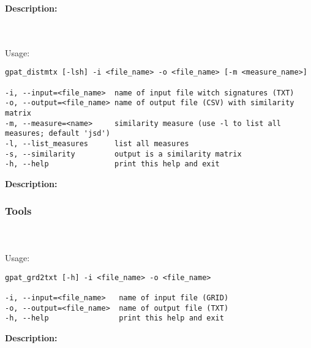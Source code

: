 
{\bf Description:}

{}
\\\\
Usage:

\begin{minipage}{\linewidth}
\begin{lstlisting}
gpat_distmtx [-lsh] -i <file_name> -o <file_name> [-m <measure_name>]

-i, --input=<file_name>  name of input file witch signatures (TXT)
-o, --output=<file_name> name of output file (CSV) with similarity matrix
-m, --measure=<name>     similarity measure (use -l to list all measures; default 'jsd')
-l, --list_measures      list all measures
-s, --similarity         output is a similarity matrix
-h, --help               print this help and exit
\end{lstlisting}
\end{minipage}






{\bf Description:}

\subsubsection{Tools}
{}
\\\\
Usage:

\begin{minipage}{\linewidth}
\begin{lstlisting}
gpat_grd2txt [-h] -i <file_name> -o <file_name>

-i, --input=<file_name>   name of input file (GRID)
-o, --output=<file_name>  name of output file (TXT)
-h, --help                print this help and exit
\end{lstlisting}
\end{minipage}



{\bf Description:}

